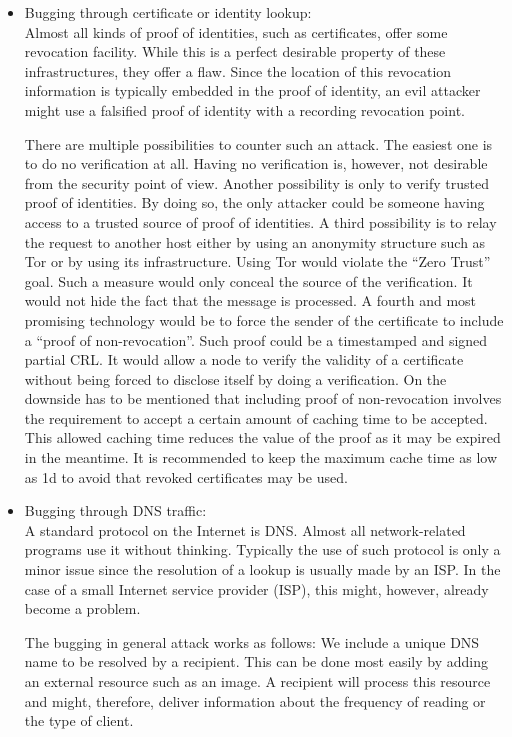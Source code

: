 \begin{itemize}
	\item Bugging through certificate or identity lookup:\\
	Almost all kinds of proof of identities, such as certificates, offer some revocation facility. While this is a perfect desirable property of these infrastructures, they offer a flaw. Since the location of this revocation information is typically embedded in the proof of identity, an evil attacker might use a falsified proof of identity with a recording revocation point.
	
	There are multiple possibilities to counter such an attack. The easiest one is to do no verification at all. Having no verification is, however, not desirable from the security point of view. Another possibility is only to verify trusted proof of identities. By doing so, the only attacker could be someone having access to a trusted source of proof of identities. A third possibility is to relay the request to another host either by using an anonymity structure such as Tor or by using its infrastructure. Using Tor would violate the ``Zero Trust'' goal. Such a measure would only conceal the source of the verification. It would not hide the fact that the message is processed. A fourth and most promising technology would be to force the sender of the certificate to include a ``proof of non-revocation''. Such proof could be a timestamped and signed partial CRL. It would allow a node to verify the validity of a certificate without being forced to disclose itself by doing a verification. On the downside has to be mentioned that including proof of non-revocation involves the requirement to accept a certain amount of caching time to be accepted. This allowed caching time reduces the value of the proof as it may be expired in the meantime. It is recommended to keep the maximum cache time as low as 1d to avoid that revoked certificates may be used. 
	
	\item Bugging through DNS traffic:\\
	A standard protocol on the Internet is DNS. Almost all network-related programs use it without thinking. Typically the use of such protocol is only a minor issue since the resolution of a lookup is usually made by an ISP. In the case of a small Internet service provider (ISP), this might, however, already become a problem.
	
	The bugging in general attack works as follows: We include a unique DNS name to be resolved by a recipient. This can be done most easily by adding an external resource such as an image. A recipient will process this resource and might, therefore, deliver information about the frequency of reading or the type of client. 
	

\end{itemize}
